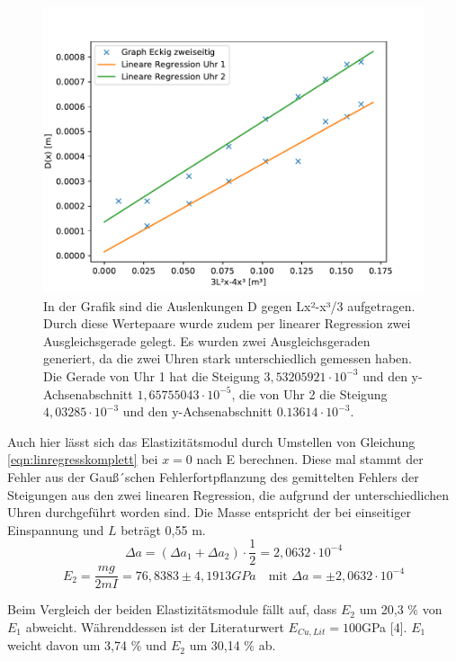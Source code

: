 \documentclass[titlepage = firstcover]{scrartcl}
\begin{document}
        \begin{figure}[h]
          \centering
          \includegraphics[width=0.7\linewidth]{ezwei.pdf}
          \caption{In der Grafik sind die Auslenkungen D gegen Lx²-x³/3 aufgetragen. Durch diese Wertepaare wurde zudem per linearer Regression zwei Ausgleichsgerade gelegt. Es wurden zwei Ausgleichsgeraden generiert, da die zwei Uhren stark unterschiedlich gemessen haben. Die Gerade von Uhr 1 hat die Steigung $3,53205921\cdot10^{-3}$ und den y-Achsenabschnitt $1,65755043\cdot10^{-5}$, die von Uhr 2 die Steigung $4,03285\cdot10^{-3}$ und den y-Achsenabschnitt $0.13614\cdot10^{-3}$.}
          \label{fig:graphEzwei}
        \end{figure}

        Auch hier lässt sich das Elastizitätsmodul durch Umstellen von Gleichung \ref{eqn:linregresskomplett} bei $x = 0$ nach E berechnen. Diese mal stammt der Fehler aus der Gauß´schen 
        Fehlerfortpflanzung des gemittelten Fehlers der Steigungen aus den zwei linearen Regression, die aufgrund der unterschiedlichen Uhren durchgeführt 
        worden sind. Die Masse entspricht der bei einseitiger Einspannung und $L$ beträgt 0,55 m.
        \begin{equation*}
          \Delta a = (\Delta a_1 + \Delta a_2) \cdot \frac{1}{2} = 2,0632 \cdot 10^{-4}
        \end{equation*}
        \begin{equation*}
          E_2 = \frac{mg}{2mI} = 76,8383 \pm 4,1913 GPa \quad \text{mit } \Delta a = \pm 2,0632 \cdot 10^{-4}
        \end{equation*}

        Beim Vergleich der beiden Elastizitätsmodule fällt auf, dass $E_2$ um 20,3 \% von $E_1$ abweicht. 
        Währenddessen ist der Literaturwert $E_{Cu,Lit} = 100$GPa [4]. $E_1$ weicht davon um 3,74 \% und $E_2$ um 30,14 \% ab.
\end{document}
